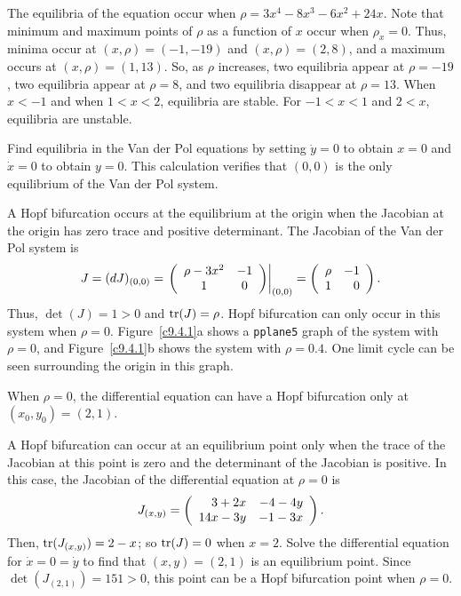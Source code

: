\documentclass{ximera}
\begin{document}
\soln The equilibria of the equation occur when
$\rho = 3x^4 - 8x^3 - 6x^2 + 24x$.  Note that minimum and maximum points of
$\rho$ as a function of $x$ occur when $\rho_x = 0$.  Thus, minima occur
at $(x,\rho) = (-1,-19)$ and $(x,\rho) = (2,8)$, and a maximum occurs at
$(x,\rho) = (1,13)$.  So, as $\rho$ increases, two equilibria appear at
$\rho = -19$, two equilibria appear at $\rho = 8$, and two equilibria
disappear at $\rho = 13$.  When $x < -1$ and when $1 < x < 2$, equilibria
are stable.  For $-1 < x < 1$ and $2 < x$, equilibria are unstable.

\begin{figure}[htb]
                       \centerline{%
                       }
\end{figure}

Find equilibria in the Van der Pol equations by setting $\dot{y}=0$ 
to obtain $x=0$ and $\dot{x} = 0$ to obtain $y=0$.  This calculation
verifies that $(0,0)$ is the only equilibrium of the Van der Pol system.  

A Hopf bifurcation occurs at the equilibrium at the origin when 
the Jacobian at the origin has zero trace and positive determinant.  
The Jacobian of the Van der Pol system is
\[
J = (dJ)_{(0,0)} = \left.\left(\begin{array}{cc} \rho-3x^2 & -1\\ 1 &0\end{array}\right)\right|_{(0,0)} =
\left(\begin{array}{rr} \rho & -1\\ 1 &0\end{array}\right).
\]
Thus, $\det(J) = 1 > 0$ and ${\rm tr}(J) = \rho$.  Hopf bifurcation can only
occur in this system when $\rho = 0$.  Figure~\ref{c9.4.1}a shows
a {\tt pplane5} graph of the system with $\rho = 0$, and
Figure~\ref{c9.4.1}b shows the system with $\rho = 0.4$.  One limit
cycle can be seen surrounding the origin in this graph.

\begin{figure}[htb]
                       \centerline{%
                       }
\end{figure}

\ans When $\rho = 0$, the differential equation can have a Hopf bifurcation 
only at $(x_0,y_0) = (2,1)$.

\soln A Hopf bifurcation can occur at an equilibrium point only when the 
trace of the Jacobian at this point is zero and the determinant of the 
Jacobian is positive.  In this case, the Jacobian of the differential 
equation at $\rho = 0$ is
\[
J_{(x,y)} = \left(\begin{array}{rr} 3 + 2x & -4 - 4y\\ 14x - 3y &-1 - 3x\end{array}\right).
\]
Then, ${\rm tr}(J_{(x,y)}) = 2 - x$; so ${\rm tr}(J) = 0$ when $x = 2$.  Solve
the differential equation for $\dot{x} = 0 = \dot{y}$ to find that $(x,y) =
(2,1)$ is an equilibrium point.  Since $\det(J_{(2,1)}) = 151 > 0$, this 
point can be a Hopf bifurcation point when $\rho = 0$.
\end{document}
